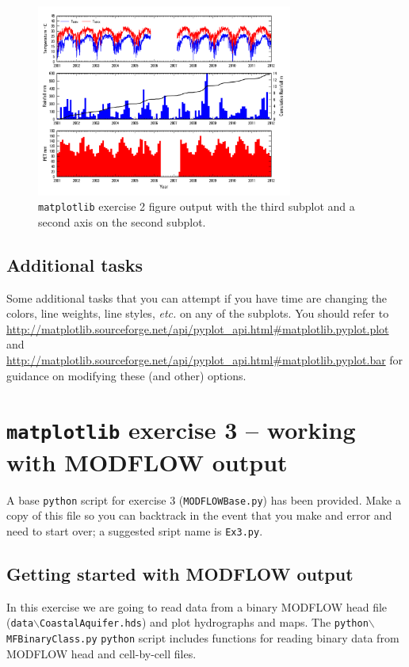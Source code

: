 \documentclass[12pt]{article}
\begin{document}
\begin{figure}
	\centering
  	\includegraphics[width=0.75\textwidth]{../figures/MeterologicBar.png}
 	\caption{\texttt{matplotlib} exercise 2 figure output with the third subplot and a second axis on the second subplot.}
	\label{FigEx2Step2}
\end{figure}

\subsection{Additional tasks}
Some additional tasks that you can attempt if you have time are changing the colors, line weights, line styles, \textit{etc.} on any of the subplots. You should refer to \url{http://matplotlib.sourceforge.net/api/pyplot_api.html\#matplotlib.pyplot.plot} and \url{http://matplotlib.sourceforge.net/api/pyplot_api.html\#matplotlib.pyplot.bar} for guidance on modifying these (and other) options.

\section{\texttt{matplotlib} exercise 3 -- working with MODFLOW output}
A base \texttt{python} script for exercise 3 (\texttt{MODFLOWBase.py}) has been provided. Make a copy of this file so you can backtrack in the event that you make and error and need to start over; a suggested sript name is \texttt{Ex3.py}.

\subsection{Getting started with MODFLOW output}
In this exercise we are going to read data from a binary MODFLOW head file (\texttt{data$\backslash$Coastal\-Aquifer.hds}) and plot hydrographs and maps. The \texttt{python$\backslash$MFBinaryClass.py} \texttt{python} script includes functions for reading binary data from MODFLOW head and cell-by-cell files. 
\end{document}
